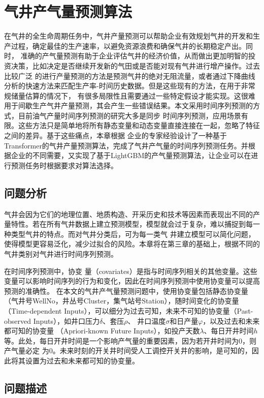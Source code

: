 \chapter{气井产气量预测算法}
在气井的全生命周期任务中，气井产量预测可以帮助企业有效规划气井的开发和生产过程，确定最佳的生产速率，以避免资源浪费和确保气井的长期稳定产出。同时，
准确的产气量预测有助于企业评估气井的经济价值，从而做出更加明智的投资决策，比如决定是否继续开发新的气田或是否能对现有气井进行增产操作。过去比较广泛
的进行产量预测的方法是预测气井的绝对无阻流量，或者通过下降曲线分析的快速方法来匹配生产率-时间历史数据。但是这些现有的方法，在用于非常规储量估算的情况下，
有很多局限性且需要通过一些特定假设才能实现。这很难用于间歇生产气井产量预测，其会产生一些错误结果。本文采用时间序列预测的方式，目前油气产量时间序列预测的研究大多是同步
时间序列预测，应用场景有限。这些方法只是简单地将所有静态变量和动态变量直接连接在一起，忽略了特征之间的差异。基于这些痛点，本章根据
企业的专家经验设计了一种基于Transformer的气井产量预测算法，完成了气井产气量的时间序列预测任务。并根据企业的不同需要，又实现了基于LightGBM的产气量预测算法，让企业可以在进行预测任务时根据要求对算法选择。
\section{问题分析}
气井会因为它们的地理位置、地质构造、开采历史和技术等因素而表现出不同的产量特性。若在所有气井数据上建立预测模型，模型就会过于复杂，难以捕捉到每一种类型气井的特点。而对气井分类后，可为每一类气
井建立模型可以简化问题，使得模型更容易泛化，减少过拟合的风险。本章将在第三章的基础上，根据不同的气井类别对气井进行时间序列预测。

在时间序列预测中，协变
量（covariates）是指与时间序列相关的其他变量。这些变量可以影响时间序列的行为和变化，因此在时间序列预测中使用协变量可以提高预测的准确性。
在本文的气井产气量预测问题中，使用协变量包括静态协变量（气井号WellNo，井丛号Cluster，集气站号Station），随时间变化的协变量
（Time-dependent Inputs），可以细分为过去可知，未来不可知的协变量（Past-observed Inputs），如井口压力\( \delta \)、套压\( \rho \)、
井口温度\( \sigma \)和日产量$\varphi $，以及过去和未来都可知的协变量
（Apriori-known Future Inputs），如投产天数\( \lambda  \)、每日开井时间$h$等。此处，每日开井时间是一个影响产气量的重要因素，因为若开井时间为0，则产气量必定
为0。未来时刻的开关井时间受人工调控开关井的影响，是可知的，因此将其设置为过去和未来都可知的协变量。
\section{问题描述}
